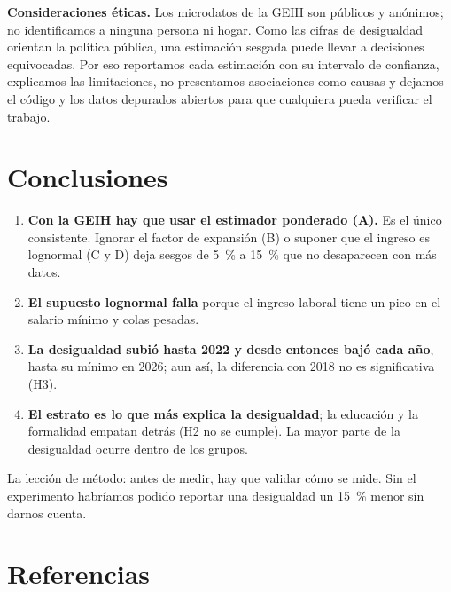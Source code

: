 \documentclass[12pt,letterpaper]{article}
\begin{document}
\textbf{Consideraciones éticas.} Los microdatos de la GEIH son públicos y anónimos; no identificamos a ninguna persona ni hogar. Como las cifras de desigualdad orientan la política pública, una estimación sesgada puede llevar a decisiones equivocadas. Por eso reportamos cada estimación con su intervalo de confianza, explicamos las limitaciones, no presentamos asociaciones como causas y dejamos el código y los datos depurados abiertos para que cualquiera pueda verificar el trabajo.

\section{Conclusiones}

\begin{enumerate}[leftmargin=0.75in]
  \item \textbf{Con la GEIH hay que usar el estimador ponderado (A).} Es el único consistente. Ignorar el factor de expansión (B) o suponer que el ingreso es lognormal (C y D) deja sesgos de 5~\% a 15~\% que no desaparecen con más datos.
  \item \textbf{El supuesto lognormal falla} porque el ingreso laboral tiene un pico en el salario mínimo y colas pesadas.
  \item \textbf{La desigualdad subió hasta 2022 y desde entonces bajó cada año}, hasta su mínimo en 2026; aun así, la diferencia con 2018 no es significativa (H3).
  \item \textbf{El estrato es lo que más explica la desigualdad}; la educación y la formalidad empatan detrás (H2 no se cumple). La mayor parte de la desigualdad ocurre dentro de los grupos.
\end{enumerate}

La lección de método: antes de medir, hay que validar cómo se mide. Sin el experimento habríamos podido reportar una desigualdad un 15~\% menor sin darnos cuenta.

\clearpage
\section{Referencias}
\end{document}
